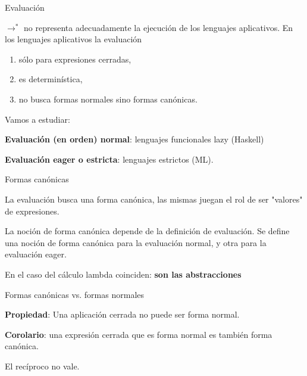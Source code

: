 \documentclass[handout]{beamer}
\begin{document}
\begin{frame}{Evaluación}

$\rightarrow^*$ no representa adecuadamente la ejecución de los lenguajes aplicativos. \pause
\medskip
En los lenguajes aplicativos la evaluación \pause
\medskip
\begin{enumerate}
\item sólo para expresiones cerradas, 
\item es determinística,
\item no busca formas normales sino formas canónicas.
\end{enumerate}\pause

\bigskip

Vamos a estudiar:

\medskip

\textbf{Evaluación (en orden) normal}: lenguajes funcionales lazy (Haskell)

\medskip

\textbf{Evaluación eager o estricta}: lenguajes estrictos (ML).

\end{frame}


\begin{frame}{Formas canónicas}

La evaluación busca una forma canónica, las mismas juegan el rol de ser "valores" de expresiones. \pause

\medskip

La noción de forma canónica depende de la definición de evaluación. Se define
una noción de forma canónica para la evaluación normal, y otra para la
evaluación eager. \pause

\medskip

En el caso del cálculo lambda coinciden: \textbf{son las abstracciones}
\end{frame}



\begin{frame}{Formas canónicas vs. formas normales}

\textbf{Propiedad}: Una aplicación cerrada no puede ser forma normal. \pause

\bigskip

\textbf{Corolario}:  una expresión cerrada que es forma normal es
también forma canónica. 

\bigskip

El recíproco no vale. 

\bigskip

\end{frame}
\end{document}
